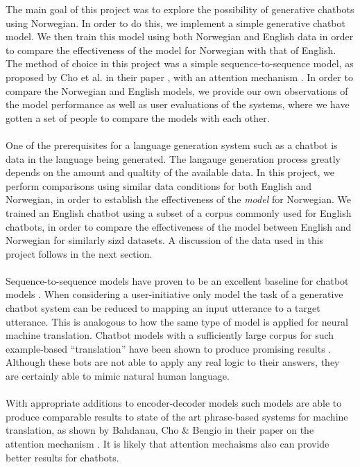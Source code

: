 \documentclass{article}
\begin{document}
The main goal of this project was to explore the possibility of generative
chatbots using Norwegian. In order to do this, we implement a simple generative
chatbot model. We then train this model using both Norwegian and English data
in order to compare the effectiveness of the model for Norwegian with that of
English. The method of choice in this project was a simple sequence-to-sequence
model, as proposed by Cho et al. in their paper \cite{Cho2014}, with an
attention mechanism \cite{Bahdanau2015}. In order to compare the Norwegian and
English models, we provide our own observations of the model performance as
well as user evaluations of the systems, where we have gotten a set of people
to compare the models with each other.

\paragraph{}
One of the prerequisites for a language generation system such as a chatbot is
data in the language being generated. The langauge generation process greatly
depends on the amount and qualtity of the available data. In this project, we
perform comparisons using similar data conditions for both English and Norwegian,
in order to establish the effectiveness of the \emph{model} for Norwegian. We
trained an English chatbot using a subset of a corpus commonly used for English
chatbots, in order to compare the effectiveness of the model between English
and Norwegian for similarly sizd datasets. A discussion of the data used in this
project follows in the next section.

\paragraph{}
Sequence-to-sequence models have proven to be an excellent baseline for
chatbot models \cite{Vinyals2015}. When considering a user-initiative only
model the task of a generative chatbot system can be reduced to mapping an
input utterance to a target utterance. This is analogous to how the same type
of model is applied for neural machine translation. Chatbot models with a
sufficiently large corpus for such example-based ``translation'' have been
shown to produce promising results \cite{Ezquerra2018}. Although these bots are
not able to apply any real logic to their answers, they are certainly able to
mimic natural human language.

\paragraph{}
With appropriate additions to encoder-decoder models such models are able to
produce comparable results to state of the art phrase-based systems for machine
translation, as shown by Bahdanau, Cho \& Bengio in their paper on the attention
mechanism \cite{Bahdanau2015}. It is likely that attention mechaisms also can
provide better results for chatbots.
\end{document}
